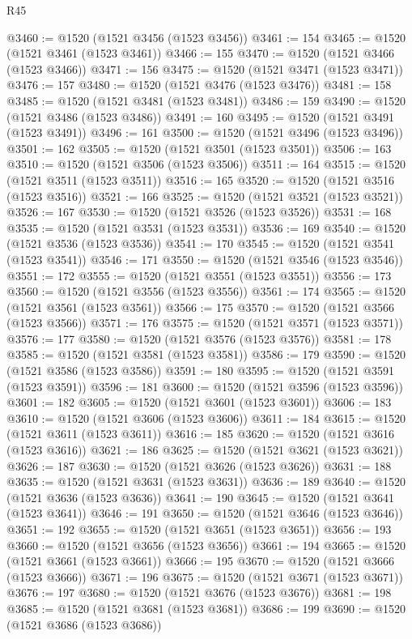 \begin{lexlean}{R45}
\begin{coremodule}
{@3460 := @1520 (@1521 @3456 (@1523 @3456))
@3461 := 154
@3465 := @1520 (@1521 @3461 (@1523 @3461))
@3466 := 155
@3470 := @1520 (@1521 @3466 (@1523 @3466))
@3471 := 156
@3475 := @1520 (@1521 @3471 (@1523 @3471))
@3476 := 157
@3480 := @1520 (@1521 @3476 (@1523 @3476))
@3481 := 158
@3485 := @1520 (@1521 @3481 (@1523 @3481))
@3486 := 159
@3490 := @1520 (@1521 @3486 (@1523 @3486))
@3491 := 160
@3495 := @1520 (@1521 @3491 (@1523 @3491))
@3496 := 161
@3500 := @1520 (@1521 @3496 (@1523 @3496))
@3501 := 162
@3505 := @1520 (@1521 @3501 (@1523 @3501))
@3506 := 163
@3510 := @1520 (@1521 @3506 (@1523 @3506))
@3511 := 164
@3515 := @1520 (@1521 @3511 (@1523 @3511))
@3516 := 165
@3520 := @1520 (@1521 @3516 (@1523 @3516))
@3521 := 166
@3525 := @1520 (@1521 @3521 (@1523 @3521))
@3526 := 167
@3530 := @1520 (@1521 @3526 (@1523 @3526))
@3531 := 168
@3535 := @1520 (@1521 @3531 (@1523 @3531))
@3536 := 169
@3540 := @1520 (@1521 @3536 (@1523 @3536))
@3541 := 170
@3545 := @1520 (@1521 @3541 (@1523 @3541))
@3546 := 171
@3550 := @1520 (@1521 @3546 (@1523 @3546))
@3551 := 172
@3555 := @1520 (@1521 @3551 (@1523 @3551))
@3556 := 173
@3560 := @1520 (@1521 @3556 (@1523 @3556))
@3561 := 174
@3565 := @1520 (@1521 @3561 (@1523 @3561))
@3566 := 175
@3570 := @1520 (@1521 @3566 (@1523 @3566))
@3571 := 176
@3575 := @1520 (@1521 @3571 (@1523 @3571))
@3576 := 177
@3580 := @1520 (@1521 @3576 (@1523 @3576))
@3581 := 178
@3585 := @1520 (@1521 @3581 (@1523 @3581))
@3586 := 179
@3590 := @1520 (@1521 @3586 (@1523 @3586))
@3591 := 180
@3595 := @1520 (@1521 @3591 (@1523 @3591))
@3596 := 181
@3600 := @1520 (@1521 @3596 (@1523 @3596))
@3601 := 182
@3605 := @1520 (@1521 @3601 (@1523 @3601))
@3606 := 183
@3610 := @1520 (@1521 @3606 (@1523 @3606))
@3611 := 184
@3615 := @1520 (@1521 @3611 (@1523 @3611))
@3616 := 185
@3620 := @1520 (@1521 @3616 (@1523 @3616))
@3621 := 186
@3625 := @1520 (@1521 @3621 (@1523 @3621))
@3626 := 187
@3630 := @1520 (@1521 @3626 (@1523 @3626))
@3631 := 188
@3635 := @1520 (@1521 @3631 (@1523 @3631))
@3636 := 189
@3640 := @1520 (@1521 @3636 (@1523 @3636))
@3641 := 190
@3645 := @1520 (@1521 @3641 (@1523 @3641))
@3646 := 191
@3650 := @1520 (@1521 @3646 (@1523 @3646))
@3651 := 192
@3655 := @1520 (@1521 @3651 (@1523 @3651))
@3656 := 193
@3660 := @1520 (@1521 @3656 (@1523 @3656))
@3661 := 194
@3665 := @1520 (@1521 @3661 (@1523 @3661))
@3666 := 195
@3670 := @1520 (@1521 @3666 (@1523 @3666))
@3671 := 196
@3675 := @1520 (@1521 @3671 (@1523 @3671))
@3676 := 197
@3680 := @1520 (@1521 @3676 (@1523 @3676))
@3681 := 198
@3685 := @1520 (@1521 @3681 (@1523 @3681))
@3686 := 199
@3690 := @1520 (@1521 @3686 (@1523 @3686))
}
\end{coremodule}
\end{lexlean}
